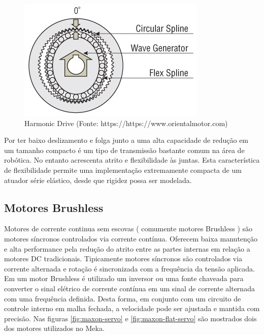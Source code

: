 \begin{figure}[H]
    \centering
    \includegraphics[width=0.6\linewidth]{tex/figs/harmonic-gear-structure.jpg}
    \caption{Harmonic Drive (Fonte: https://https://www.orientalmotor.com)}
    \label{fig:encoder}
\end{figure}

Por ter baixo deslizamento e folga junto a uma alta capacidade de redução em um tamanho compacto é um tipo de transmissão bastante comum na área de robótica. No entanto acrescenta atrito e flexibilidade às juntas. Esta característica de flexibilidade permite uma implementação extremamente compacta de um atuador série elástico, desde que rigidez possa ser modelada.





\subsection{Motores Brushless}
Motores de corrente continua sem escovas ( comumente motores Brushless ) são motores síncronos controlados via corrente contínua. Oferecem baixa manutenção e alta performance pela redução do atrito entre as partes internas em relação a motores DC tradicionais. Tipicamente motores síncronos são controlados via corrente alternada e rotação é sincronizada com a frequência da tensão aplicada. Em um motor Brushless é utilizado um inversor ou uma fonte chaveada para converter o sinal elétrico de corrente contínua em um sinal de corrente alternada com uma frequência definida. Desta forma, em conjunto com um circuito de controle interno em malha fechada, a velocidade pode ser ajustada e mantida com precisão. Nas figuras \ref{fig:maxon-servo} e \ref{fig:maxon-flat-servo} são mostrados dois dos motores utilizados no Meka.

